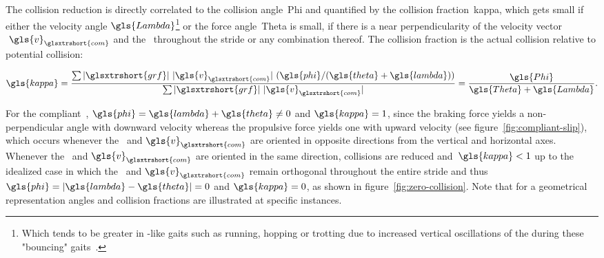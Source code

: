             The collision reduction is directly correlated to the collision angle~\gls{Phi} and quantified by the collision fraction~\gls{kappa}, which gets small if either the velocity angle$~\gls{Lambda}$\footnote{Which tends to be greater in -like gaits such as running, hopping or trotting due to increased vertical oscillations of the  during these "bouncing" gaits~\cite{Lee2013}.} or the force angle~\gls{Theta} is small, if there is a near perpendicularity of the velocity vector$~\gls{v}_{\glsxtrshort{com}}$ and the~ throughout the stride or any combination thereof. The collision fraction is the actual collision relative to potential collision:
            
            \begin{align}
                \gls{kappa} = \frac{\sum\vert\glsxtrshort{grf}\vert~\vert\gls{v}_{\glsxtrshort{com}}\vert~(\gls{phi} / (\gls{theta} + \gls{lambda}))}{\sum\vert\glsxtrshort{grf}\vert~\vert\gls{v}_{\glsxtrshort{com}}\vert} = \frac{\gls{Phi}}{\gls{Theta} + \gls{Lambda}}.
                \label{eq:collision-fraction}
            \end{align}
            
            For the compliant~,$~\gls{phi} = \gls{lambda} + \gls{theta} \neq 0$ and $\gls{kappa} = 1$, since the braking force yields a non-perpendicular angle with downward velocity whereas the propulsive force yields one with upward velocity (see figure~\ref{fig:compliant-slip}), which occurs whenever the~ and$~\gls{v}_{\glsxtrshort{com}}$ are oriented in opposite directions from the vertical and horizontal axes. Whenever the~ and$~\gls{v}_{\glsxtrshort{com}}$ are oriented in the same direction, collisions are reduced and~$\gls{kappa} < 1$ up to the idealized case in which the~ and$~\gls{v}_{\glsxtrshort{com}}$ remain orthogonal throughout the entire stride and thus~$\gls{phi} = \lvert\gls{lambda} - \gls{theta}\rvert = 0$ and $\gls{kappa} = 0$, as shown in figure~\ref{fig:zero-collision}. Note that for a geometrical representation angles and collision fractions are illustrated at specific instances.~\cite{Lee2011}
            